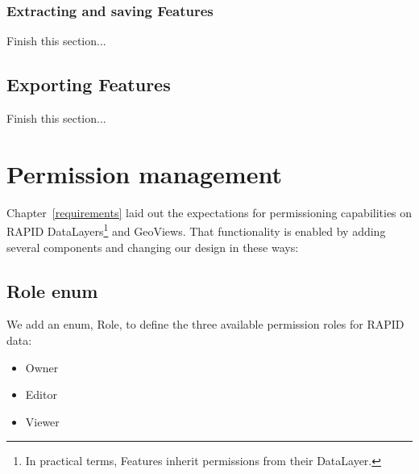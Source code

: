  \subsubsection{Extracting and saving Features}
 Finish this section...

\subsection{Exporting Features}
Finish this section...







\section{Permission management}
Chapter~\ref{requirements} laid out the expectations for permissioning capabilities on RAPID DataLayers\footnote{In practical terms, Features inherit permissions from their DataLayer.} and GeoViews. That functionality is enabled by adding several components and changing our design in these ways:

\subsection{Role enum}
We add an enum, Role, to define the three available permission roles for RAPID data:
\begin{itemize}

  \item Owner
  \item Editor 
  \item Viewer
  \end{itemize}

